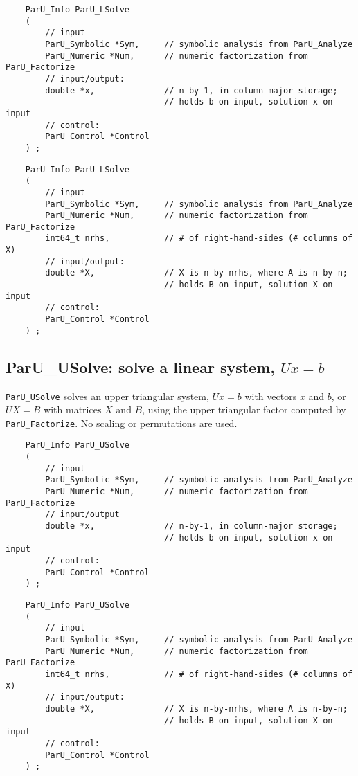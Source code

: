 \documentclass[12pt]{article}
\begin{document}
    {\footnotesize
    \begin{verbatim}
    ParU_Info ParU_LSolve
    (
        // input
        ParU_Symbolic *Sym,     // symbolic analysis from ParU_Analyze
        ParU_Numeric *Num,      // numeric factorization from ParU_Factorize
        // input/output:
        double *x,              // n-by-1, in column-major storage;
                                // holds b on input, solution x on input
        // control:
        ParU_Control *Control
    ) ; \end{verbatim} }

    {\footnotesize
    \begin{verbatim}
    ParU_Info ParU_LSolve
    (
        // input
        ParU_Symbolic *Sym,     // symbolic analysis from ParU_Analyze
        ParU_Numeric *Num,      // numeric factorization from ParU_Factorize
        int64_t nrhs,           // # of right-hand-sides (# columns of X)
        // input/output:
        double *X,              // X is n-by-nrhs, where A is n-by-n;
                                // holds B on input, solution X on input
        // control:
        ParU_Control *Control
    ) ; \end{verbatim} }

\subsection{{\sf ParU\_USolve}: solve a linear system, $Ux=b$}

    \verb'ParU_USolve' solves an upper triangular system, $Ux=b$ with vectors
    $x$ and $b$, or $UX=B$ with matrices $X$ and $B$, using the upper
    triangular factor computed by \verb'ParU_Factorize'.  No scaling or
    permutations are used.

    {\footnotesize
    \begin{verbatim}
    ParU_Info ParU_USolve
    (
        // input
        ParU_Symbolic *Sym,     // symbolic analysis from ParU_Analyze
        ParU_Numeric *Num,      // numeric factorization from ParU_Factorize
        // input/output
        double *x,              // n-by-1, in column-major storage;
                                // holds b on input, solution x on input
        // control:
        ParU_Control *Control
    ) ; \end{verbatim} }

    {\footnotesize
    \begin{verbatim}
    ParU_Info ParU_USolve
    (
        // input
        ParU_Symbolic *Sym,     // symbolic analysis from ParU_Analyze
        ParU_Numeric *Num,      // numeric factorization from ParU_Factorize
        int64_t nrhs,           // # of right-hand-sides (# columns of X)
        // input/output:
        double *X,              // X is n-by-nrhs, where A is n-by-n;
                                // holds B on input, solution X on input
        // control:
        ParU_Control *Control
    ) ; \end{verbatim} }
\end{document}
